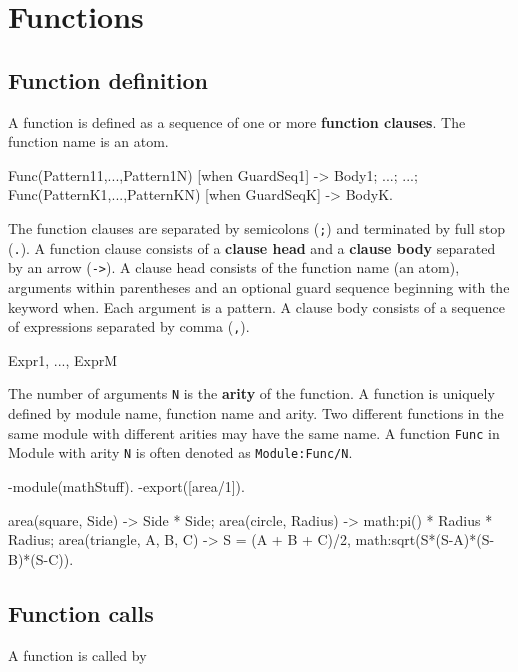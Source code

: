 \chapter{Functions}

\section{Function definition}
A function is defined as a sequence of one or more \textbf{function
clauses}. The function name is an atom.

\begin{erlang}
Func(Pattern11,...,Pattern1N) [when GuardSeq1] -> Body1;
    ...;
    ...;
Func(PatternK1,...,PatternKN) [when GuardSeqK] -> BodyK.

\end{erlang}

The function clauses are separated by semicolons (\texttt{;}) and
terminated by full stop (\texttt{.}). A function clause consists of a
\textbf{clause head} and a \textbf{clause body} separated by an arrow
(\texttt{->}). A clause head consists of the function name (an atom),
arguments within parentheses and an optional guard sequence beginning
with the keyword when. Each argument is a pattern. A clause
body\textbf{ }consists of a sequence of expressions separated by comma
(\texttt{,}).

\begin{erlang}
Expr1,
...,
ExprM
\end{erlang}

The number of arguments \texttt{N} is the \textbf{arity} of the
function. A function is uniquely defined by module name, function name
and arity. Two different functions in the same module with different
arities may have the same name. A function \texttt{Func} in Module
with arity \texttt{N} is often denoted as \texttt{Module:Func/N}.

\begin{erlang}
-module(mathStuff).
-export([area/1]).

area({square, Side}) -> Side * Side;
area({circle, Radius}) -> math:pi() * Radius * Radius;
area({triangle, A, B, C}) ->
    S = (A + B + C)/2,
    math:sqrt(S*(S-A)*(S-B)*(S-C)).
\end{erlang}


\section{Function calls}
A function is called by

